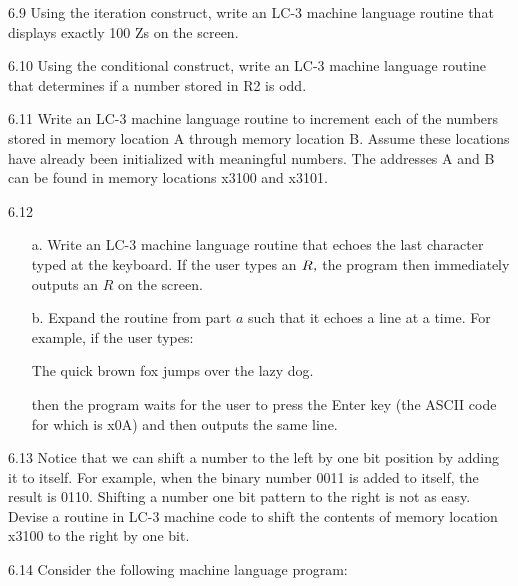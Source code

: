 \documentclass{patt}
\begin{document}
\begin{exercises}
\item[6.9]
Using the iteration construct, write an LC-3 machine language routine
that displays exactly 100 Zs on the screen.

\item[6.10] Using the conditional construct, write an LC-3 machine language
routine that determines if a number stored in R2 is odd.

\item[6.11] Write an LC-3 machine language routine to increment each of the
numbers stored in memory location A through memory location B.
Assume these locations have already been initialized with meaningful
numbers.  The addresses A and B can be found in memory locations
x3100 and x3101.

\enlargethispage*{6pt}

\item[6.12]
\begin{enumerate}[b.]
\item[a.]
Write an LC-3 machine language routine that echoes the last character
typed at the keyboard.  If the user types an $R\hbox{{\em ,}}$ the program then
immediately outputs an $R$ on the screen.

\item[b.]
Expand the routine from part $a$ such that it echoes a line at a
time.  For example, if the user types:

\medskip

\begin{colorverbatim}
The quick brown fox jumps over the lazy dog.
\end{colorverbatim}

\medskip

\noindent
then the program waits for the user to press the Enter
key (the ASCII code for which is x0A) and then outputs the same
line.
\end{enumerate}
\item[6.13]
Notice that we can shift a number to the left by one bit position
by adding it to itself. For example, when the binary number 0011
is added to itself, the result is 0110.  Shifting a number one bit
pattern to the right is not as easy.  Devise a routine in LC-3
machine code to shift the contents of memory location x3100 to
the right by one bit.

\item[6.14]
Consider the following machine language program:


\end{exercises}
\end{document}
